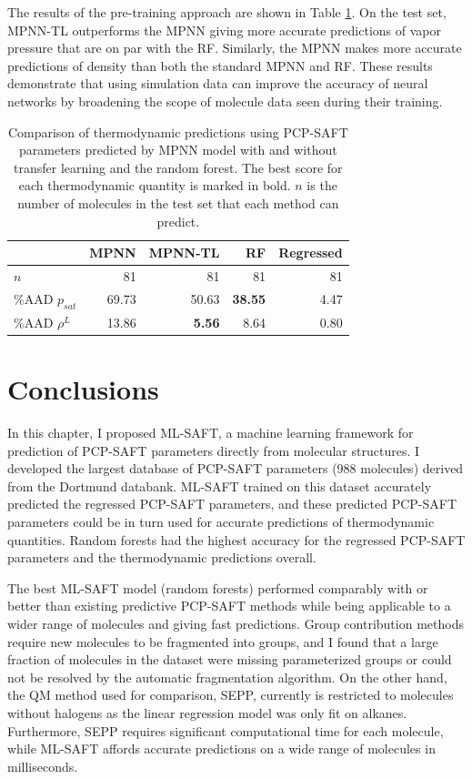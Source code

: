 The results of the pre-training approach are shown in Table \ref{tab:scores_tl}. On the test set, MPNN-TL outperforms the MPNN giving more accurate predictions of vapor pressure that are on par with the RF. Similarly, the MPNN makes more accurate predictions of density than both the standard MPNN and RF. These results demonstrate that using simulation data can improve the accuracy of neural networks by broadening the scope of molecule data seen during their training. 

\begin{table}
    \caption{Comparison of thermodynamic predictions using PCP-SAFT parameters predicted by MPNN model with and without transfer learning and the random forest. The best score for each thermodynamic quantity  is marked in bold. $n$ is the number of molecules in the test set that each method can predict.}
    \begin{center}
            \begin{tabular}{lrrr|r}
                & MPNN & MPNN-TL & RF & Regressed \\
                \hline
                $n$ & 81 & 81 & 81 & 81 \\
                \%AAD $p_{sat}$ & 69.73 & 50.63 & \textbf{38.55} & 4.47 \\
                \%AAD $\rho^{L}$ & 13.86 & \textbf{5.56} & 8.64 & 0.80 \\
                \hline
            \end{tabular}
    \end{center}
    \label{tab:scores_tl}
\end{table}

\section{Conclusions}

In this chapter, I proposed ML-SAFT, a machine learning framework for prediction of PCP-SAFT parameters directly from molecular structures. I developed the largest database of PCP-SAFT parameters (988 molecules) derived from the Dortmund databank. ML-SAFT trained on this dataset accurately predicted the regressed PCP-SAFT parameters, and these predicted PCP-SAFT parameters could be in turn used for accurate predictions of thermodynamic quantities. Random forests had the highest accuracy for the regressed PCP-SAFT parameters and the thermodynamic predictions overall.

The best ML-SAFT model (random forests) performed comparably with or better than existing predictive PCP-SAFT methods while being applicable to a wider range of molecules and giving fast predictions. Group contribution methods require new molecules to be fragmented into groups, and I found that a large fraction of molecules in the dataset were missing parameterized groups or could not be resolved by the automatic fragmentation algorithm. On the other hand, the QM method used for comparison, SEPP, currently is restricted to molecules without halogens as the linear regression model was only fit on alkanes. Furthermore, SEPP requires significant computational time for each molecule, while ML-SAFT affords accurate predictions on a wide range of molecules in milliseconds.

